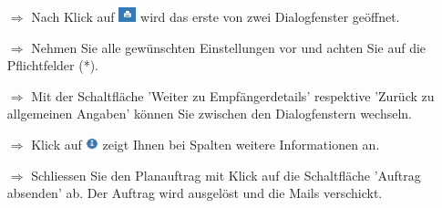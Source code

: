 \documentclass{article}
\begin{document}
\begin{multicols}{2}
\begin{tcolorbox}[colback=blue!5,colframe=blue!40!black,title=Plandruck Dialogfenster]
\begin{itemize}
  \item[$\Longrightarrow$] Nach Klick auf \includegraphics[height=12pt]{Icons/dk_drucken.jpg} wird das erste von zwei Dialogfenster geöffnet.
  \item[$\Longrightarrow$] Nehmen Sie alle gewünschten Einstellungen vor und achten Sie auf die Pflichtfelder (*).
  \item[$\Longrightarrow$] Mit der Schaltfläche 'Weiter zu Empfängerdetails' respektive 'Zurück zu allgemeinen Angaben' können Sie zwischen den Dialogfenstern wechseln.
	\item[$\Longrightarrow$] Klick auf \includegraphics[height=10pt]{Icons/info_blau.png} zeigt Ihnen bei Spalten weitere Informationen an.
	\item[$\Longrightarrow$] Schliessen Sie den Planauftrag mit Klick auf die Schaltfläche 'Auftrag absenden' ab. Der Auftrag wird ausgelöst und die Mails verschickt.
\end{itemize}
\end{tcolorbox}

\end{multicols}

\end{document}
